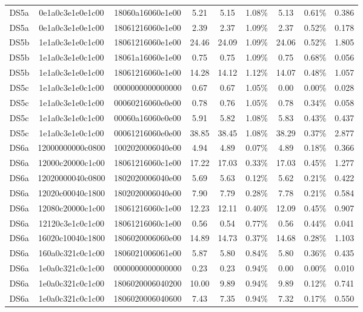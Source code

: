 \begin{tabular}{|c|c c|c|c c|c c|c|}
  DS5a & 0e1a0c3e1e0e1c00 & 18060a16060e1e00 & 5.21 & 5.15 & 1.08\% & 5.13 & 0.61\% & 0.386 \\
  DS5a & 0e1a0c3e1e0e1c00 & 18061216060e1e00 & 2.39 & 2.37 & 1.09\% & 2.37 & 0.52\% & 0.178 \\
  DS5b & 1e1a0c3e1e0c1c00 & 18061216060e1e00 & 24.46 & 24.09 & 1.09\% & 24.06 & 0.52\% & 1.805 \\
  DS5b & 1e1a0c3e1e0c1c00 & 18061a16060e1e00 & 0.75 & 0.75 & 1.09\% & 0.75 & 0.68\% & 0.056 \\
  DS5b & 1e1a0c3e1e0e1c00 & 18061216060e1e00 & 14.28 & 14.12 & 1.12\% & 14.07 & 0.48\% & 1.057 \\
  DS5c & 1e1a0c3e1e0c1c00 & 0000000000000000 & 0.67 & 0.67 & 1.05\% & 0.00 & 0.00\% & 0.028 \\
  DS5c & 1e1a0c3e1e0c1c00 & 00060216060e0e00 & 0.78 & 0.76 & 1.05\% & 0.78 & 0.34\% & 0.058 \\
  DS5c & 1e1a0c3e1e0c1c00 & 00060a16060e0e00 & 5.91 & 5.82 & 1.08\% & 5.83 & 0.43\% & 0.437 \\
  DS5c & 1e1a0c3e1e0c1c00 & 00061216060e0e00 & 38.85 & 38.45 & 1.08\% & 38.29 & 0.37\% & 2.877 \\
  DS6a & 12000000000c0800 & 1002020006040e00 & 4.94 & 4.89 & 0.07\% & 4.89 & 0.18\% & 0.366 \\
  DS6a & 12000c20000c1c00 & 18061216060c1e00 & 17.22 & 17.03 & 0.33\% & 17.03 & 0.45\% & 1.277 \\
  DS6a & 12020000040c0800 & 1802020006040e00 & 5.69 & 5.63 & 0.12\% & 5.62 & 0.21\% & 0.422 \\
  DS6a & 12020c00040c1800 & 1802020006040e00 & 7.90 & 7.79 & 0.28\% & 7.78 & 0.21\% & 0.584 \\
  DS6a & 12080c20000c1c00 & 18061216060c1e00 & 12.23 & 12.11 & 0.40\% & 12.09 & 0.45\% & 0.907 \\
  DS6a & 12120c3e1c0c1c00 & 18061216060c1e00 & 0.56 & 0.54 & 0.77\% & 0.56 & 0.44\% & 0.041 \\
  DS6a & 16020c10040c1800 & 1806020006060e00 & 14.89 & 14.73 & 0.37\% & 14.68 & 0.28\% & 1.103 \\
  DS6a & 160a0c321c0c1c00 & 1806021006061e00 & 5.87 & 5.80 & 0.84\% & 5.80 & 0.36\% & 0.435 \\
  DS6a & 1e0a0c321c0c1c00 & 0000000000000000 & 0.23 & 0.23 & 0.94\% & 0.00 & 0.00\% & 0.010 \\
  DS6a & 1e0a0c321c0c1c00 & 1806020006040200 & 10.00 & 9.89 & 0.94\% & 9.89 & 0.12\% & 0.741 \\
  DS6a & 1e0a0c321c0c1c00 & 1806020006040600 & 7.43 & 7.35 & 0.94\% & 7.32 & 0.17\% & 0.550 \\

\end{tabular}
